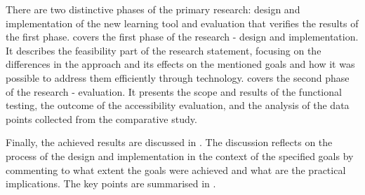 There are two distinctive phases of the primary research: design and implementation of the new learning tool and evaluation that verifies the results of the first phase.
 covers the first phase of the research - design and implementation.
It describes the feasibility part of the research statement, focusing on the differences in the approach and its effects on the mentioned goals and how it was possible to address them efficiently through technology.
 covers the second phase of the research - evaluation.
It presents the scope and results of the functional testing, the outcome of the accessibility evaluation, and the analysis of the data points collected from the comparative study.

Finally, the achieved results are discussed in .
The discussion reflects on the process of the design and implementation in the context of the specified goals by commenting to what extent the goals were achieved and what are the practical implications.
The key points are summarised in .
